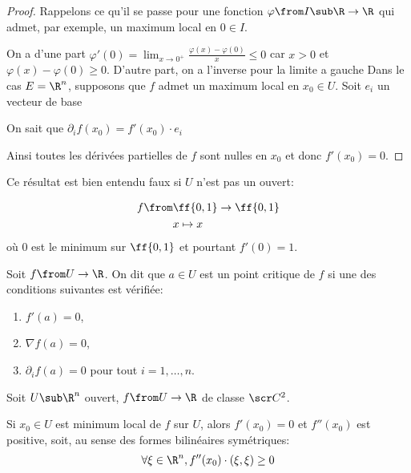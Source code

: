 \begin{proof}
    Rappelons ce qu'il se passe pour une fonction \(\varphi\from I\sub \R\to\R\) qui
    admet, par exemple, un maximum local en \(0\in I\).

    On a d'une part \(\varphi'(0) = \lim_{x\to0^+}\frac{\varphi(x)-\varphi(0)}{x}\leq 0\)
    car \(x>0\) et \(\varphi(x) - \varphi(0)\geq 0\).
    D'autre part, on a l'inverse pour la limite a gauche %
    Dans le cas \(E = \R^n\), supposons que \(f\) admet un maximum local en \(x_0\in U\).
    Soit \(e_i\) un vecteur de base

    On sait que \(\partial_i f(x_0) = f'(x_0)\cdot e_i\) %


    Ainsi toutes les dérivées partielles de \(f\) sont nulles en \(x_0\) et donc
    \(f'(x_0) = 0\).
\end{proof}

\begin{remark}
    Ce résultat est bien entendu faux si \(U\) n'est pas un ouvert:

    \begin{equation*}
        \begin{aligned}
            f\from &\ff{0,1}\to\ff{0,1}\\
            &x\mapsto x
        \end{aligned}
    \end{equation*}
    où 0 est le minimum sur \(\ff{0,1}\) et pourtant \(f'(0)=1\).
\end{remark}

\begin{definition}
    Soit \(f\from U\to \R\). On dit que \(a\in U\) est un point critique de \(f\) si 
    une des conditions suivantes est vérifiée:
    \begin{enumerate}[label=(\roman*)]
        \item \(f'(a)=0\),
        \item \(\nabla f(a) = 0\),
        \item \(\partial_i f(a) = 0\) pour tout \(i=1,\ldots,n\).
    \end{enumerate}
\end{definition}

\begin{theorem}
    Soit \(U\sub\R^n\) ouvert, \(f\from U\to \R\) de classe \(\scr C^2\).

    Si \(x_0\in U\) est minimum local de \(f\) sur \(U\), alors \(f'(x_0) = 0\)
    et \(f''(x_0)\) est positive, soit, au sense des formes bilinéaires symétriques:
    \begin{equation*}
        \forall \xi\in\R^n,f''(x_0)\cdot(\xi, \xi)\geq 0
    \end{equation*}
\end{theorem}

